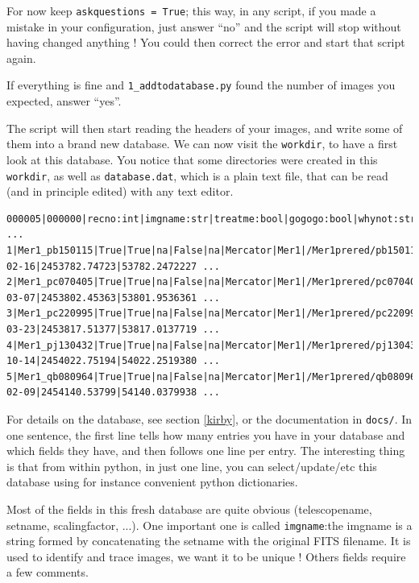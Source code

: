 For now keep \verb+askquestions = True+; this way, in any script, if you made a mistake in your configuration, just answer ``no'' and the script will stop without having changed anything ! You could then correct the error and start that script again.

If everything is fine and \verb+1_addtodatabase.py+ found the number of images you expected, answer ``yes''.

The script will then start reading the headers of your images, and write some of them into a brand new database. We can now visit the \verb+workdir+, to have a first look at this database. You notice that some directories were created in this  \verb+workdir+, as well as  \verb+database.dat+, which is a plain text file, that can be read (and in principle edited) with any text editor.

\begin{Verbatim}[fontsize=\relsize{-3}]
000005|000000|recno:int|imgname:str|treatme:bool|gogogo:bool|whynot:str|testlist:bool|testcomment:str|telescopename:str|setname:str ...
1|Mer1_pb150115|True|True|na|False|na|Mercator|Mer1|/Mer1prered/pb150115.fits|1.0|0.19340976|2006-02-16|2453782.74723|53782.2472227 ...
2|Mer1_pc070405|True|True|na|False|na|Mercator|Mer1|/Mer1prered/pc070405.fits|1.0|0.19340976|2006-03-07|2453802.45363|53801.9536361 ...
3|Mer1_pc220995|True|True|na|False|na|Mercator|Mer1|/Mer1prered/pc220995.fits|1.0|0.19340976|2006-03-23|2453817.51377|53817.0137719 ...
4|Mer1_pj130432|True|True|na|False|na|Mercator|Mer1|/Mer1prered/pj130432.fits|1.0|0.19340976|2006-10-14|2454022.75194|54022.2519380 ...
5|Mer1_qb080964|True|True|na|False|na|Mercator|Mer1|/Mer1prered/qb080964.fits|1.0|0.19340976|2007-02-09|2454140.53799|54140.0379938 ...
\end{Verbatim}


For details on the database, see section \ref{kirby}, or the documentation in \verb+docs/+. In one sentence, the first line tells how many entries you have in your database and which fields they have, and then follows one line per entry. The interesting thing is that from within python, in just one line, you can select/update/etc this database using for instance convenient python dictionaries.

Most of the fields in this fresh database are quite obvious (telescopename, setname, scalingfactor, ...). One important one is called \verb+imgname+:the imgname is a string formed by concatenating the setname with the original FITS filename. It is used to identify and trace images, we want it to be unique !
Others fields require a few comments.

